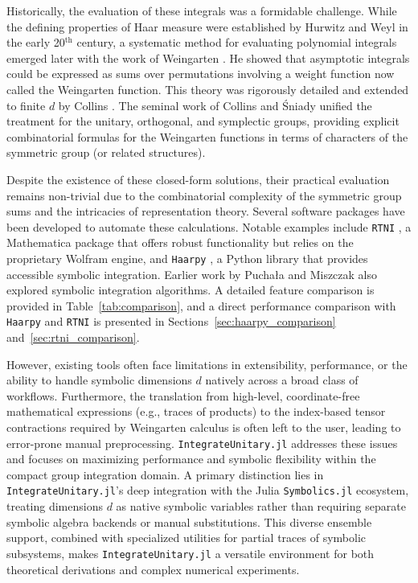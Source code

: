 \documentclass[manuscript,screen]{acmart}
\begin{document}
Historically, the evaluation of these integrals was a formidable challenge.
While the defining properties of Haar measure were established by Hurwitz and
Weyl in the early 20$^\mathrm{th}$ century, a systematic method for evaluating
polynomial integrals emerged later with the work of Weingarten
\cite{weingarten1978asymptotic}. He showed that asymptotic integrals could be
expressed as sums over permutations involving a weight function now called the
Weingarten function. This theory was rigorously detailed and extended to finite
$d$ by Collins \cite{collins2003moments}. The seminal work of Collins and Śniady
\cite{collins2006integration} unified the treatment for the unitary, orthogonal,
and symplectic groups, providing explicit combinatorial formulas for the
Weingarten functions in terms of characters of the symmetric group (or related
structures).

Despite the existence of these closed-form solutions, their practical evaluation
remains non-trivial due to the combinatorial complexity of the symmetric group
sums and the intricacies of representation theory. Several software packages
have been developed to automate these calculations. Notable examples include
\texttt{RTNI} \cite{fukuda2019rtni}, a Mathematica package that offers robust
functionality but relies on the proprietary Wolfram engine, and \texttt{Haarpy}
\cite{cardin2024haarpy}, a Python library that provides accessible symbolic
integration. Earlier work by Puchała and Miszczak \cite{puchala2017symbolic}
also explored symbolic integration algorithms. A detailed feature comparison
is provided in Table~\ref{tab:comparison}, and a direct performance comparison
with \texttt{Haarpy} and \texttt{RTNI} is presented in
Sections~\ref{sec:haarpy_comparison} and~\ref{sec:rtni_comparison}.

However, existing tools often face limitations in extensibility, performance, or
the ability to handle symbolic dimensions $d$ natively across a broad class of workflows.
Furthermore, the translation from high-level, coordinate-free mathematical
expressions (e.g., traces of products) to the index-based tensor contractions
required by Weingarten calculus is often left to the user, leading to
error-prone manual preprocessing. \texttt{IntegrateUnitary.jl} addresses these issues and
focuses on maximizing performance and symbolic flexibility within the compact
group integration domain. A primary distinction lies in \texttt{IntegrateUnitary.jl}'s deep
integration with the Julia \texttt{Symbolics.jl} ecosystem, treating dimensions
$d$ as native symbolic variables rather than requiring separate
symbolic algebra backends or manual substitutions.
This diverse ensemble support, combined with specialized utilities for partial traces of symbolic subsystems, makes \texttt{IntegrateUnitary.jl} a versatile
environment for both theoretical derivations and complex numerical experiments.
\end{document}
